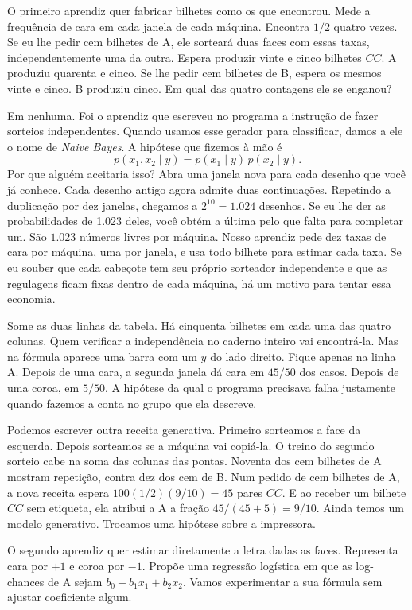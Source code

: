 O primeiro aprendiz quer fabricar bilhetes como os que encontrou. Mede a frequência de cara em cada janela de cada máquina. Encontra $1/2$ quatro vezes. Se eu lhe pedir cem bilhetes de A, ele sorteará duas faces com essas taxas, independentemente uma da outra. Espera produzir vinte e cinco bilhetes $CC$. A produziu quarenta e cinco. Se lhe pedir cem bilhetes de B, espera os mesmos vinte e cinco. B produziu cinco. Em qual das quatro contagens ele se enganou?

Em nenhuma. Foi o aprendiz que escreveu no programa a instrução de fazer sorteios independentes. Quando usamos esse gerador para classificar, damos a ele o nome de \emph{Naive Bayes}. A hipótese que fizemos à mão é
\[
     p(x_1,x_2\mid y)=p(x_1\mid y)\,p(x_2\mid y).
\]
Por que alguém aceitaria isso? Abra uma janela nova para cada desenho que você já conhece. Cada desenho antigo agora admite duas continuações. Repetindo a duplicação por dez janelas, chegamos a $2^{10}=1.024$ desenhos. Se eu lhe der as probabilidades de 1.023 deles, você obtém a última pelo que falta para completar um. São $1.023$ números livres por máquina. Nosso aprendiz pede dez taxas de cara por máquina, uma por janela, e usa todo bilhete para estimar cada taxa. Se eu souber que cada cabeçote tem seu próprio sorteador independente e que as regulagens ficam fixas dentro de cada máquina, há um motivo para tentar essa economia.

Some as duas linhas da tabela. Há cinquenta bilhetes em cada uma das quatro colunas. Quem verificar a independência no caderno inteiro vai encontrá-la. Mas na fórmula aparece uma barra com um $y$ do lado direito. Fique apenas na linha A. Depois de uma cara, a segunda janela dá cara em $45/50$ dos casos. Depois de uma coroa, em $5/50$. A hipótese da qual o programa precisava falha justamente quando fazemos a conta no grupo que ela descreve.

Podemos escrever outra receita generativa. Primeiro sorteamos a face da esquerda. Depois sorteamos se a máquina vai copiá-la. O treino do segundo sorteio cabe na soma das colunas das pontas. Noventa dos cem bilhetes de A mostram repetição, contra dez dos cem de B. Num pedido de cem bilhetes de A, a nova receita espera $100(1/2)(9/10)=45$ pares $CC$. E ao receber um bilhete $CC$ sem etiqueta, ela atribui a A a fração $45/(45+5)=9/10$. Ainda temos um modelo generativo. Trocamos uma hipótese sobre a impressora.

O segundo aprendiz quer estimar diretamente a letra dadas as faces. Representa cara por $+1$ e coroa por $-1$. Propõe uma regressão logística em que as log-chances de A sejam $b_0+b_1x_1+b_2x_2$. Vamos experimentar a sua fórmula sem ajustar coeficiente algum.


